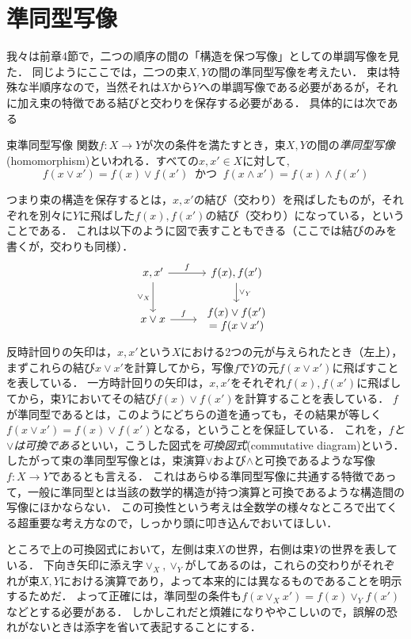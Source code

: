\documentclass[11pt,a4paper, dvipdfmx]{jsarticle}
\begin{document}
\section{準同型写像}
我々は前章4節で，二つの順序の間の「構造を保つ写像」としての単調写像を見た．
同じようにここでは，二つの束$X, Y$の間の準同型写像を考えたい．
束は特殊な半順序なので，当然それは$X$から$Y$への単調写像である必要があるが，それに加え束の特徴である結びと交わりを保存する必要がある．
具体的には次である

\begin{itembox}[l]{束準同型写像}
関数$f:X \to Y$が次の条件を満たすとき，束$X, Y$の間の\emph{準同型写像}(homomorphism)といわれる．すべての$x, x' \in X$に対して, 
\[
 f(x \vee x') = f(x) \vee f(x') \ \text{ かつ } \ f(x \wedge x') = f(x) \wedge f(x')
\]
\end{itembox}
つまり束の構造を保存するとは，$x, x'$の結び（交わり）を飛ばしたものが，それぞれを別々に$Y$に飛ばした$f(x), f(x')$の結び（交わり）になっている，ということである．
これは以下のように図で表すこともできる（ここでは結びのみを書くが，交わりも同様）．
\[
\begin{tikzcd}
x, x' \arrow{r}{f} \arrow[swap]{d}{\vee_X} 
& f(x), f(x') \arrow{d}{\vee_Y} \\
x \vee x \arrow{r}{f} 
& \begin{array}{c} f(x) \vee f(x') \\ = f(x \vee x') \end{array}
\end{tikzcd}
\]
反時計回りの矢印は，$x, x'$という$X$における2つの元が与えられたとき（左上），まずこれらの結び$x \vee x'$を計算してから，写像$f$で$Y$の元$f(x \vee x')$に飛ばすことを表している．
一方時計回りの矢印は，$x, x'$をそれぞれ$f(x), f(x')$に飛ばしてから，束$Y$においてその結び$f(x) \vee f(x')$を計算することを表している．
$f$が準同型であるとは，このようにどちらの道を通っても，その結果が等しく$f(x \vee x') = f(x) \vee f(x')$となる，ということを保証している．
これを，\emph{$f$と$\vee$は可換である}といい，こうした図式を\emph{可換図式}(commutative diagram)という．
したがって束の準同型写像とは，束演算$\vee$および$\wedge$と可換であるような写像$f:X \to Y$であるとも言える．
これはあらゆる準同型写像に共通する特徴であって，一般に準同型とは当該の数学的構造が持つ演算と可換であるような構造間の写像にほかならない．
この可換性という考えは全数学の様々なところで出てくる超重要な考え方なので，しっかり頭に叩き込んでおいてほしい．

ところで上の可換図式において，左側は束$X$の世界，右側は束$Y$の世界を表している．
下向き矢印に添え字$\vee_X, \vee_Y$がしてあるのは，これらの交わりがそれぞれが束$X, Y$における演算であり，よって本来的には異なるものであることを明示するためだ．
よって正確には，準同型の条件も$f(x \vee_X x') = f(x) \vee_Y f(x')$などとする必要がある．
しかしこれだと煩雑になりややこしいので，誤解の恐れがないときは添字を省いて表記することにする．
\end{document}

